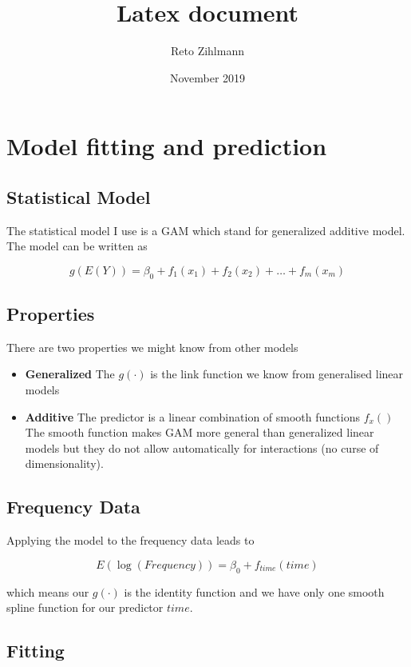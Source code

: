 \documentclass{article}\usepackage[]{graphicx}\usepackage[]{color}
\title{Latex document}
\author{Reto Zihlmann}
\date{November 2019}
\begin{document}
\maketitle

\section{Model fitting and prediction}

\subsection{Statistical Model}


The statistical model I use is a GAM which stand for generalized additive model. The model can be written as

$$
g(E(Y)) = \beta_0 + f_1(x_1) + f_2(x_2) + \dots + f_m(x_m)
$$

\subsection{Properties}

There are two properties we might know from other models

\begin{itemize}
	\item[] \textbf{Generalized} The $g(\cdot)$ is the link function we know from generalised linear models
	\item[] \textbf{Additive} The predictor is a linear combination of smooth functions $f_x()$ The smooth function makes GAM more general than generalized linear models but they do not allow automatically for interactions (no curse of dimensionality).
\end{itemize}

\subsection{Frequency Data}

Applying the model to the frequency data leads to

$$
E(\log(Frequency)) = \beta_0 + f_{time}(time)
$$

which means our $g(\cdot)$ is the identity function and we have only one smooth spline function for our predictor $time$. 

\subsection{Fitting}
\end{document}
